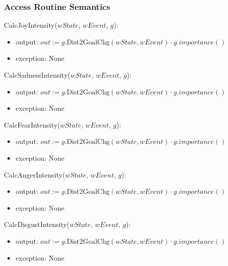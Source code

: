 \subsubsection{Access Routine Semantics}

\noindent CalcJoyIntensity($\mathit{wState}$, $\mathit{wEvent}$, $g$):
\begin{itemize}

    \item output: $out := g.\text{Dist2GoalChg}(\mathit{wState},
    \mathit{wEvent}) \cdot g.importance()$

    \item exception: None

\end{itemize}

\noindent CalcSadnessIntensity($\mathit{wState}$, $\mathit{wEvent}$, $g$):
\begin{itemize}

    \item output: $out := g.\text{Dist2GoalChg}(\mathit{wState},
    \mathit{wEvent}) \cdot g.importance()$

    \item exception: None

\end{itemize}

\noindent CalcFearIntensity($\mathit{wState}$, $\mathit{wEvent}$, $g$):
\begin{itemize}

    \item output: $out := g.\text{Dist2GoalChg}(\mathit{wState},
    \mathit{wEvent}) \cdot g.importance()$

    \item exception: None

\end{itemize}

\noindent CalcAngerIntensity($\mathit{wState}$, $\mathit{wEvent}$, $g$):
\begin{itemize}

    \item output: $out := g.\text{Dist2GoalChg}(\mathit{wState},
    \mathit{wEvent}) \cdot g.importance()$

    \item exception: None

\end{itemize}

\noindent CalcDisgustIntensity($\mathit{wState}$, $\mathit{wEvent}$, $g$):
\begin{itemize}

    \item output: $out := g.\text{Dist2GoalChg}(\mathit{wState},
    \mathit{wEvent}) \cdot g.importance()$

    \item exception: None

\end{itemize}


